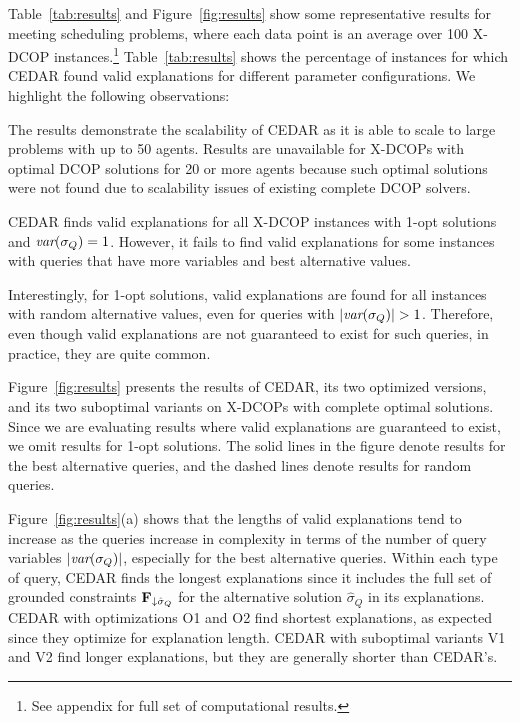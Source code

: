 \documentclass[twoside,11pt]{article}
\begin{document}
Table~\ref{tab:results} and Figure~\ref{fig:results} show some representative results for meeting scheduling problems, where each data point is an average over 100 X-DCOP instances.\footnote{See appendix for full set of computational results.} Table~\ref{tab:results} shows the percentage of instances for which CEDAR found valid explanations for different parameter configurations. We highlight the following observations:
\squishlist
\item The results demonstrate the scalability of CEDAR as it is able to scale to large problems with up to 50 agents. Results are unavailable for X-DCOPs with optimal DCOP solutions for 20 or more agents because such optimal solutions were not found due to scalability issues of existing complete DCOP solvers. 
\item CEDAR finds valid explanations for all X-DCOP instances with 1-opt solutions and ${\textit{var}(\sigma_Q)} = 1$. However, it fails to find valid explanations for some instances with queries that have more variables and best alternative values.%
\item Interestingly, for 1-opt solutions, valid explanations are found for all instances with random alternative values, even for queries with $|{\textit{var}(\sigma_Q)}| > 1$. Therefore, even though valid explanations are not guaranteed to exist for such queries, in practice, they are quite common. %
\squishend

Figure~\ref{fig:results} presents the results of CEDAR, its two optimized versions, and its two suboptimal variants on X-DCOPs with complete optimal solutions. Since we are evaluating results where valid explanations are guaranteed to exist, we omit results for 1-opt solutions. The solid lines in the figure denote results for the best alternative queries, and the dashed lines denote results for random queries. 

Figure~\ref{fig:results}(a) shows that the lengths of valid explanations tend to increase as the queries increase in complexity in terms of the number of query variables $|{\textit{var}(\sigma_Q)}|$, especially for the best alternative queries. Within each type of query, CEDAR finds the longest explanations since it includes the full set of grounded constraints ${\bf{F}}_{\downarrow \hat{\sigma}_Q}$ for the alternative solution $\hat{\sigma}_Q$ in its explanations. CEDAR with optimizations O1 and O2 find shortest explanations, as expected since they optimize for explanation length. CEDAR with suboptimal variants V1 and V2 find longer explanations, but they are generally shorter than CEDAR's.
\end{document}
